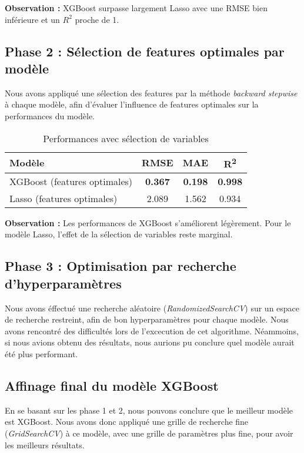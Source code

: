 \textbf{Observation :} XGBoost surpasse largement Lasso avec une RMSE bien inférieure et un $R^2$ proche de 1.

\subsection{Phase 2 : Sélection de features optimales par modèle}

Nous avons appliqué une sélection des features par la méthode \textit{backward stepwise} à chaque modèle, afin d'évaluer l’influence de features optimales sur la performances du modèle.

\begin{table}[h]
\centering
\begin{tabular}{|l|c|c|c|}
\hline
\textbf{Modèle} & \textbf{RMSE} & \textbf{MAE} & \textbf{R\textsuperscript{2}} \\
\hline
XGBoost (features optimales) & \textbf{0.367} & \textbf{0.198} & \textbf{0.998} \\
Lasso (features optimales) & 2.089 & 1.562 & 0.934 \\
\hline
\end{tabular}
\caption{Performances avec sélection de variables}
\end{table}

\textbf{Observation :} Les performances de XGBoost s'améliorent légèrement. Pour le modèle Lasso, l’effet de la sélection de variables reste marginal.

\subsection{Phase 3 : Optimisation par recherche d’hyperparamètres}

Nous avons éffectué une recherche aléatoire (\textit{RandomizedSearchCV}) sur un espace de recherche restreint, afin de bon hyperparamètres pour chaque modèle.
Nous avons rencontré des difficultés lors de l'excecution de cet algorithme. Néammoins, si nous avions obtenu des résultats, nous aurions pu conclure quel modèle aurait été plus performant.


\subsection{Affinage final du modèle XGBoost}

En se basant sur les phase 1 et 2, nous pouvons conclure que le meilleur modèle est XGBoost. Nous avons donc appliqué une grille de recherche fine (\textit{GridSearchCV}) à ce  modèle, avec une grille de paramètres plus fine, pour avoir les meilleurs résultats.



